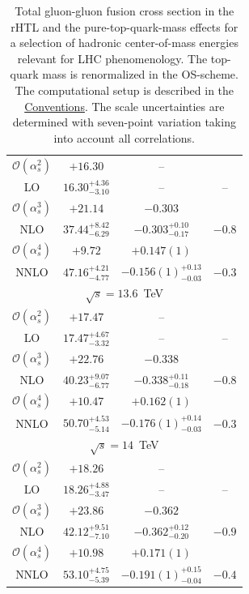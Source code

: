 \begin{table}[ht]
\begin{tabular}{cccc}
\hline
$\mathcal{O}(\alpha_s^2)$ & $+16.30$ & -- &   \\
LO & $16.30^{+4.36}_{-3.10}$ & -- & --  \\
\hline
$\mathcal{O}(\alpha_s^3)$ & $+21.14$ & $-0.303$ &  \\
NLO & $37.44^{+8.42}_{-6.29}$ & $-0.303^{+0.10}_{-0.17}$ & $-0.8$  \\
\hline
$\mathcal{O}(\alpha_s^4)$ & $+9.72$ & $+0.147(1)$ &   \\
NNLO & $47.16^{+4.21}_{-4.77}$ & $-0.156(1)^{+0.13}_{-0.03}$ & $-0.3$  \\
\hline
\hline
\multicolumn{4}{c}{$\sqrt{s}=13.6$~TeV}\\
\hline
$\mathcal{O}(\alpha_s^2)$ & $+17.47$ & -- &   \\
LO & $17.47^{+4.67}_{-3.32}$ & -- & --  \\
\hline
$\mathcal{O}(\alpha_s^3)$ & $+22.76$ & $-0.338$ &   \\
NLO & $40.23^{+9.07}_{-6.77}$ & $-0.338^{+0.11}_{-0.18}$ & $-0.8$  \\
\hline
$\mathcal{O}(\alpha_s^4)$ & $+10.47$ & $+0.162(1)$ &  \\
NNLO & $50.70^{+4.53}_{-5.14}$ & $-0.176(1)^{+0.14}_{-0.03}$ & $-0.3$  \\
\hline
\hline
\multicolumn{4}{c}{$\sqrt{s}=14$~TeV}\\
\hline
$\mathcal{O}(\alpha_s^2)$ & $+18.26$ & -- &   \\
LO & $18.26^{+4.88}_{-3.47}$ & -- & --  \\
\hline
$\mathcal{O}(\alpha_s^3)$ & $+23.86$ & $-0.362$ &   \\
NLO & $42.12^{+9.51}_{-7.10}$ & $-0.362^{+0.12}_{-0.20}$ & $-0.9$  \\
\hline
$\mathcal{O}(\alpha_s^4)$ & $+10.98$ & $+0.171(1)$ &   \\
NNLO & $53.10^{+4.75}_{-5.39}$ & $-0.191(1)^{+0.15}_{-0.04}$ & $-0.4$  \\
\hline
\end{tabular}
\caption{Total gluon-gluon fusion cross section in the \acs{rHTL} and the pure-top-quark-mass effects for a selection of hadronic center-of-mass energies relevant for \acs{LHC} phenomenology. The top-quark mass is renormalized in the \acs{OS}-scheme. The computational setup is described in the \hyperref[chap:notation_and_conventions]{Conventions}. The scale uncertainties are determined with seven-point variation taking into account all correlations.}
\label{tab:6:t-HEFT}
\end{table}

